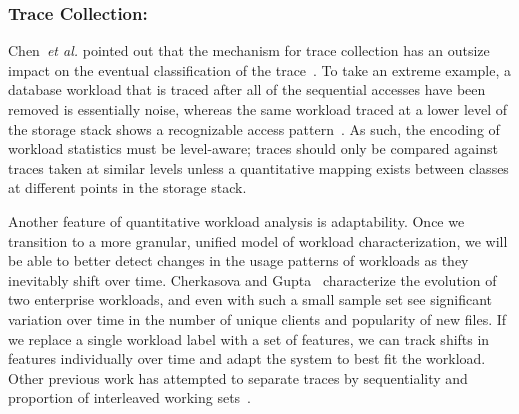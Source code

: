 \subsubsection*{Trace Collection: }
Chen~\emph{et al.} pointed out that
the mechanism for trace collection has an outsize impact on the eventual
classification of the trace~\cite{chen-kmeans}.  To take an extreme
example, a database workload that is traced after all of the sequential accesses
have been removed is essentially noise, whereas the same workload traced at a
lower level of the storage stack shows a recognizable access
pattern~\cite{hands}.  As such, the encoding of workload statistics must be
level-aware; traces should only be compared against traces taken at similar
levels unless a quantitative mapping exists between classes at different points
in the storage stack.  


Another feature of quantitative workload analysis is adaptability.  Once we
transition to a more granular, unified model of workload characterization, we
will be able to better detect changes in the usage patterns of workloads as they
inevitably shift over time.  Cherkasova and Gupta~\cite{char_local} characterize the
evolution of two enterprise workloads, and even with such a small sample set see
significant variation over time in the number of unique clients and popularity
of new files.  If we replace a single workload label with a set of features, we
can track shifts in features individually over time and adapt the system to best
fit the workload.  Other previous work has attempted to separate traces by sequentiality and
proportion of interleaved working sets~\cite{seo_char}.  



